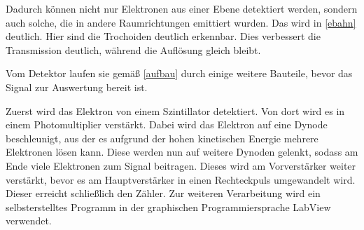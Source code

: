 
Dadurch können nicht nur Elektronen aus einer Ebene detektiert werden, sondern auch solche, die in andere Raumrichtungen emittiert wurden. Das wird in \cref{ebahn} deutlich. Hier sind die Trochoiden deutlich erkennbar. Dies verbessert die Transmission deutlich, während die Auflösung gleich bleibt.


Vom Detektor laufen sie gemäß \cref{aufbau} durch einige weitere Bauteile, bevor das Signal zur Auswertung bereit ist.


Zuerst wird das Elektron von einem Szintillator detektiert. Von dort wird es in einem Photomultiplier verstärkt. Dabei wird das Elektron auf eine Dynode beschleunigt, aus der es aufgrund der hohen kinetischen Energie mehrere Elektronen lösen kann. Diese werden nun auf weitere Dynoden gelenkt, sodass am Ende viele Elektronen zum Signal beitragen. Dieses wird am Vorverstärker weiter verstärkt, bevor es am Hauptverstärker in einen Rechteckpuls umgewandelt wird. Dieser erreicht schließlich den Zähler. Zur weiteren Verarbeitung wird ein selbsterstelltes Programm in der graphischen Programmiersprache LabView verwendet.